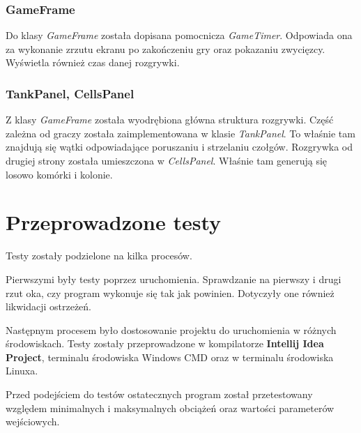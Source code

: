 \documentclass[a4paper]{article}
\begin{document}
\subsubsection{GameFrame}
\quad Do klasy \textit{GameFrame} zosta\l{}a dopisana pomocnicza \textit{GameTimer}. Odpowiada ona za wykonanie zrzutu ekranu po zako\'nczeniu gry oraz pokazaniu zwyci\k{e}zcy. Wy\'swietla r\'ownie\.z czas danej rozgrywki.

\subsubsection{TankPanel, CellsPanel}
\quad Z klasy \textit{GameFrame} zosta\l{}a wyodr\k{e}biona g\l{}\'owna struktura rozgrywki.
Cz\k{e}\'s\'c zale\.zna od graczy zosta\l{}a zaimplementowana w klasie \textit{TankPanel}. To w\l{}a\'snie tam znajduj\k{a} si\k{e} w\k{a}tki odpowiadaj\k{a}ce poruszaniu i strzelaniu czo\l{}g\'ow.
Rozgrywka od drugiej strony zosta\l{}a umieszczona w \textit{CellsPanel}. W\l{}a\'snie tam generuj\k{a} si\k{e} losowo kom\'orki i kolonie. 

\section{Przeprowadzone testy}

\quad Testy zosta\l{}y podzielone na kilka proces\'ow.

Pierwszymi by\l{}y testy poprzez uruchomienia. Sprawdzanie na pierwszy i drugi rzut oka, czy program wykonuje si\k{e} tak jak powinien. Dotyczy\l{}y one r\'ownie\.z likwidacji ostrze\.ze\'n.

Nast\k{e}pnym procesem by\l{}o dostosowanie projektu do uruchomienia w r\'o\.znych \'srodowiskach. Testy zosta\l{}y przeprowadzone w kompilatorze \textbf{Intellij Idea Project}, terminalu \'srodowiska Windows CMD oraz w terminalu \'srodowiska Linuxa.

Przed podej\'sciem do test\'ow ostatecznych program zosta\l{} przetestowany wzgl\k{e}dem minimalnych i maksymalnych obci\k{a}\.ze\'n oraz warto\'sci parameter\'ow wej\'sciowych.
\end{document}
